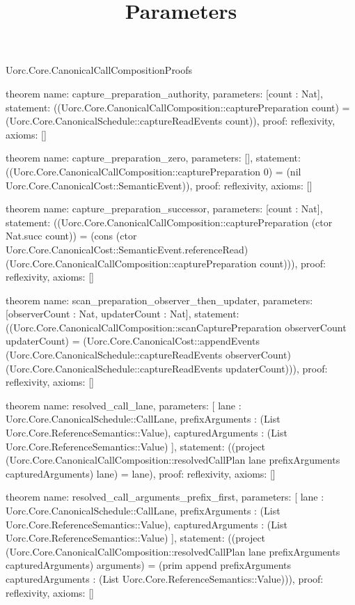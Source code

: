 \begin{lexlean}{Uorc.Core.CanonicalCallCompositionProofs}
\title{Parameters}
\begin{semanticmodule}
theorem{
  name: capture_preparation_authority,
  parameters: [count : Nat],
  statement: ((Uorc.Core.CanonicalCallComposition::capturePreparation count) = (Uorc.Core.CanonicalSchedule::captureReadEvents count)),
  proof: reflexivity{},
  axioms: []
}

theorem{
  name: capture_preparation_zero,
  parameters: [],
  statement: ((Uorc.Core.CanonicalCallComposition::capturePreparation 0) = (nil Uorc.Core.CanonicalCost::SemanticEvent)),
  proof: reflexivity{},
  axioms: []
}

theorem{
  name: capture_preparation_successor,
  parameters: [count : Nat],
  statement: ((Uorc.Core.CanonicalCallComposition::capturePreparation (ctor Nat.succ count)) = (cons (ctor Uorc.Core.CanonicalCost::SemanticEvent.referenceRead) (Uorc.Core.CanonicalCallComposition::capturePreparation count))),
  proof: reflexivity{},
  axioms: []
}

theorem{
  name: scan_preparation_observer_then_updater,
  parameters: [observerCount : Nat, updaterCount : Nat],
  statement: ((Uorc.Core.CanonicalCallComposition::scanCapturePreparation observerCount updaterCount) = (Uorc.Core.CanonicalCost::appendEvents (Uorc.Core.CanonicalSchedule::captureReadEvents observerCount) (Uorc.Core.CanonicalSchedule::captureReadEvents updaterCount))),
  proof: reflexivity{},
  axioms: []
}

theorem{
  name: resolved_call_lane,
  parameters: [
    lane : Uorc.Core.CanonicalSchedule::CallLane,
    prefixArguments : (List Uorc.Core.ReferenceSemantics::Value),
    capturedArguments : (List Uorc.Core.ReferenceSemantics::Value)
  ],
  statement: ((project (Uorc.Core.CanonicalCallComposition::resolvedCallPlan lane prefixArguments capturedArguments) lane) = lane),
  proof: reflexivity{},
  axioms: []
}

theorem{
  name: resolved_call_arguments_prefix_first,
  parameters: [
    lane : Uorc.Core.CanonicalSchedule::CallLane,
    prefixArguments : (List Uorc.Core.ReferenceSemantics::Value),
    capturedArguments : (List Uorc.Core.ReferenceSemantics::Value)
  ],
  statement: ((project (Uorc.Core.CanonicalCallComposition::resolvedCallPlan lane prefixArguments capturedArguments) arguments) = (prim append prefixArguments capturedArguments : (List Uorc.Core.ReferenceSemantics::Value))),
  proof: reflexivity{},
  axioms: []
}


\end{semanticmodule}
\end{lexlean}
